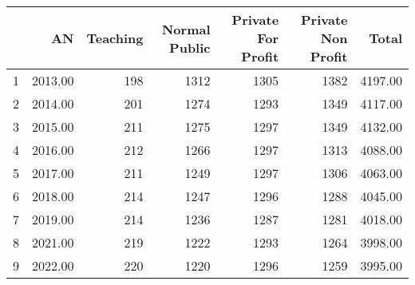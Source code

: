 \begin{tabular}{rrrrrrr}
  \toprule
 & AN & Teaching & Normal Public & Private For Profit & Private Non Profit & Total \\ 
  \midrule
1 & 2013.00 & 198 & 1312 & 1305 & 1382 & 4197.00 \\ 
  2 & 2014.00 & 201 & 1274 & 1293 & 1349 & 4117.00 \\ 
  3 & 2015.00 & 211 & 1275 & 1297 & 1349 & 4132.00 \\ 
  4 & 2016.00 & 212 & 1266 & 1297 & 1313 & 4088.00 \\ 
  5 & 2017.00 & 211 & 1249 & 1297 & 1306 & 4063.00 \\ 
  6 & 2018.00 & 214 & 1247 & 1296 & 1288 & 4045.00 \\ 
  7 & 2019.00 & 214 & 1236 & 1287 & 1281 & 4018.00 \\ 
  8 & 2021.00 & 219 & 1222 & 1293 & 1264 & 3998.00 \\ 
  9 & 2022.00 & 220 & 1220 & 1296 & 1259 & 3995.00 \\ 
   \bottomrule
\end{tabular}
